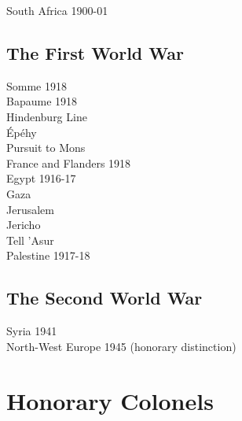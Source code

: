 \begin{center}
  South Africa 1900-01
\end{center}

\section*{The First World War}

\begin{center}
  Somme 1918 \\
  Bapaume 1918 \\
  Hindenburg Line \\
  Épéhy \\
  Pursuit to Mons \\
  France and Flanders 1918 \\
  Egypt 1916-17 \\
  Gaza \\
  Jerusalem \\
  Jericho \\
  Tell 'Asur \\
  Palestine 1917-18
\end{center}

\section*{The Second World War}

\begin{center}
  Syria 1941 \\
  North-West Europe 1945 (honorary distinction)
\end{center}

\chapter{Honorary Colonels}

